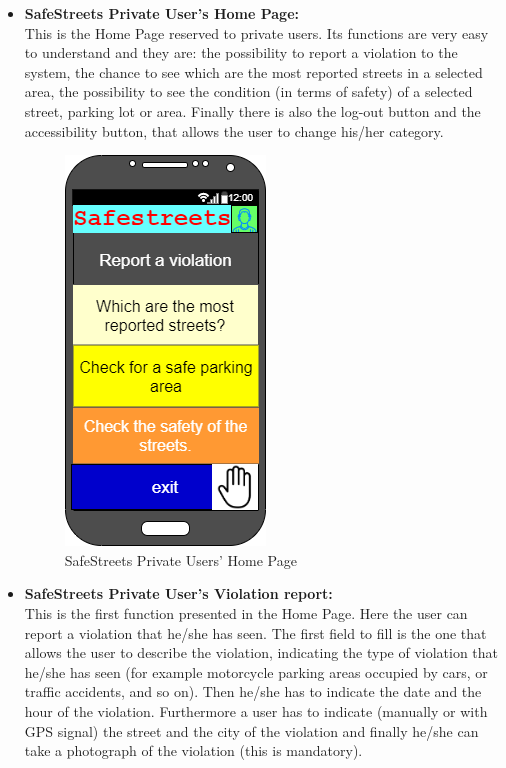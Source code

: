 \documentclass[titlepage]{article}
\begin{document}
\begin{itemize}
\begin{itemize}
	\newpage
	
	
	
	
	
	\item \textbf{SafeStreets Private User's Home Page:}\\


		
	This is the Home Page reserved to private users. Its functions are very easy to understand and they are: the possibility to report a violation to the system, the chance to see which are the most reported streets in a selected area, the possibility to see the condition (in terms of safety) of a selected street, parking lot or area. Finally there is also the log-out button and the accessibility button, that allows the user to change his/her category.

	
	
	\begin{figure}[h]
	\includegraphics[scale=0.8]{Mockups/main functionalities.png}
	\centering
	\caption{SafeStreets Private Users' Home Page}
	\end{figure}
	\FloatBarrier
	
	\newpage	
	
	
	\item \textbf{SafeStreets Private User's Violation report:}\\

	This is the first function presented in the Home Page. Here the user can report a violation that he/she has seen. The first field to fill is the one that allows the user to describe the violation, indicating the type of violation that he/she has seen (for example motorcycle parking areas occupied by cars, or traffic accidents, and so on). Then he/she has to indicate the date and the hour of the violation. Furthermore a user has to indicate (manually or with GPS signal) the street and the city of the violation and finally he/she can take a photograph of the violation (this is mandatory).
	

\end{itemize}
\end{itemize}
\end{document}
